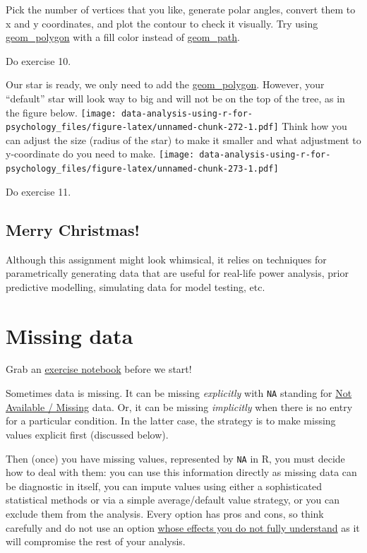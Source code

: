 \documentclass[
]{book}
\begin{document}
Pick the number of vertices that you like, generate polar angles, convert them to x and y coordinates, and plot the contour to check it visually. Try using \href{https://ggplot2.tidyverse.org/reference/geom_polygon.html}{geom\_polygon} with a fill color instead of \href{https://ggplot2.tidyverse.org/reference/geom_path.html}{geom\_path}.

Do exercise 10.

Our star is ready, we only need to add the \href{https://ggplot2.tidyverse.org/reference/geom_polygon.html}{geom\_polygon}. However, your ``default'' star will look way to big and will not be on the top of the tree, as in the figure below.
\texttt{[image: data-analysis-using-r-for-psychology\_files/figure-latex/unnamed-chunk-272-1.pdf]}
Think how you can adjust the size (radius of the star) to make it smaller and what adjustment to y-coordinate do you need to make.
\texttt{[image: data-analysis-using-r-for-psychology\_files/figure-latex/unnamed-chunk-273-1.pdf]}

Do exercise 11.

\hypertarget{merry-christmas}{%
\section{Merry Christmas!}\label{merry-christmas}}

Although this assignment might look whimsical, it relies on techniques for parametrically generating data that are useful for real-life power analysis, prior predictive modelling, simulating data for model testing, etc.

\hypertarget{missing-data}{%
\chapter{Missing data}\label{missing-data}}

Grab an \href{notebooks/Seminar\%2011\%20-\%20missing\%20data.Rmd}{exercise notebook} before we start!

Sometimes data is missing. It can be missing \emph{explicitly} with \texttt{NA} standing for \href{https://stat.ethz.ch/R-manual/R-devel/library/base/html/NA.html}{Not Available / Missing} data. Or, it can be missing \emph{implicitly} when there is no entry for a particular condition. In the latter case, the strategy is to make missing values explicit first (discussed below).

Then (once) you have missing values, represented by \texttt{NA} in R, you must decide how to deal with them: you can use this information directly as missing data can be diagnostic in itself, you can impute values using either a sophisticated statistical methods or via a simple average/default value strategy, or you can exclude them from the analysis. Every option has pros and cons, so think carefully and do not use an option \href{https://www.reddit.com/r/AskStatistics/comments/rvw9ur/is_it_best_to_fill_in_missing_data_with_0s/}{whose effects you do not fully understand} as it will compromise the rest of your analysis.
\end{document}
